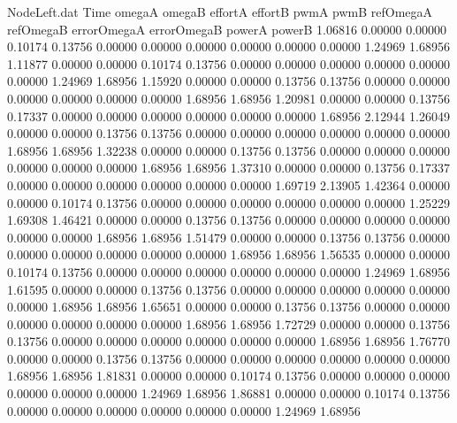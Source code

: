 \begin{filecontents}{NodeLeft.dat}
Time omegaA omegaB effortA effortB pwmA pwmB refOmegaA refOmegaB errorOmegaA errorOmegaB powerA powerB
   1.06816    0.00000    0.00000     0.10174    0.13756    0.00000    0.00000    0.00000    0.00000    0.00000    0.00000    1.24969    1.68956
   1.11877    0.00000    0.00000     0.10174    0.13756    0.00000    0.00000    0.00000    0.00000    0.00000    0.00000    1.24969    1.68956
   1.15920    0.00000    0.00000     0.13756    0.13756    0.00000    0.00000    0.00000    0.00000    0.00000    0.00000    1.68956    1.68956
   1.20981    0.00000    0.00000     0.13756    0.17337    0.00000    0.00000    0.00000    0.00000    0.00000    0.00000    1.68956    2.12944
   1.26049    0.00000    0.00000     0.13756    0.13756    0.00000    0.00000    0.00000    0.00000    0.00000    0.00000    1.68956    1.68956
   1.32238    0.00000    0.00000     0.13756    0.13756    0.00000    0.00000    0.00000    0.00000    0.00000    0.00000    1.68956    1.68956
   1.37310    0.00000    0.00000     0.13756    0.17337    0.00000    0.00000    0.00000    0.00000    0.00000    0.00000    1.69719    2.13905
   1.42364    0.00000    0.00000     0.10174    0.13756    0.00000    0.00000    0.00000    0.00000    0.00000    0.00000    1.25229    1.69308
   1.46421    0.00000    0.00000     0.13756    0.13756    0.00000    0.00000    0.00000    0.00000    0.00000    0.00000    1.68956    1.68956
   1.51479    0.00000    0.00000     0.13756    0.13756    0.00000    0.00000    0.00000    0.00000    0.00000    0.00000    1.68956    1.68956
   1.56535    0.00000    0.00000     0.10174    0.13756    0.00000    0.00000    0.00000    0.00000    0.00000    0.00000    1.24969    1.68956
   1.61595    0.00000    0.00000     0.13756    0.13756    0.00000    0.00000    0.00000    0.00000    0.00000    0.00000    1.68956    1.68956
   1.65651    0.00000    0.00000     0.13756    0.13756    0.00000    0.00000    0.00000    0.00000    0.00000    0.00000    1.68956    1.68956
   1.72729    0.00000    0.00000     0.13756    0.13756    0.00000    0.00000    0.00000    0.00000    0.00000    0.00000    1.68956    1.68956
   1.76770    0.00000    0.00000     0.13756    0.13756    0.00000    0.00000    0.00000    0.00000    0.00000    0.00000    1.68956    1.68956
   1.81831    0.00000    0.00000     0.10174    0.13756    0.00000    0.00000    0.00000    0.00000    0.00000    0.00000    1.24969    1.68956
   1.86881    0.00000    0.00000     0.10174    0.13756    0.00000    0.00000    0.00000    0.00000    0.00000    0.00000    1.24969    1.68956

\end{filecontents}
